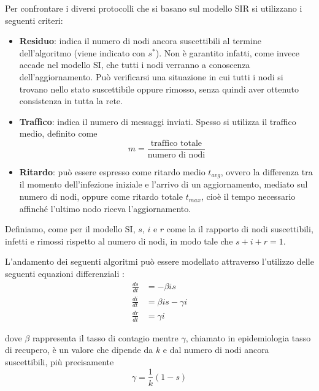 Per confrontare i diversi protocolli che si basano sul modello SIR si utilizzano i seguenti criteri:
\begin{itemize}
    \item \textbf{Residuo}: indica il numero di nodi ancora suscettibili al termine dell’algoritmo (viene indicato con $s^*$). Non è garantito infatti, come invece accade nel modello SI, che tutti i nodi verranno a conoscenza dell’aggiornamento. Può verificarsi una situazione in cui tutti i nodi si trovano nello stato suscettibile oppure rimosso, senza quindi aver ottenuto consistenza in tutta la rete.
    \item \textbf{Traffico}: indica il numero di messaggi inviati. Spesso si utilizza il traffico medio, definito come
    \begin{equation}
        m = \frac{\textrm{traffico totale}}{\textrm{numero di nodi}}        
    \end{equation}
    \item \textbf{Ritardo}: può essere espresso come ritardo medio $t_{avg}$, ovvero la differenza tra il momento dell'infezione iniziale e l'arrivo di un aggiornamento, mediato sul numero di nodi, oppure come ritardo totale $t_{max}$, cioè il tempo necessario affinché l'ultimo nodo riceva l'aggiornamento.
\end{itemize}  
Definiamo, come per il modello SI, $s$, $i$ e $r$ come la il rapporto di nodi suscettibili, infetti e rimossi rispetto al numero di nodi, in modo tale che $s + i + r = 1$.

L’andamento dei seguenti algoritmi può essere modellato attraverso l’utilizzo delle seguenti equazioni differenziali \cite{hethcote}:
\begin{equation}
    \begin{split}
        \frac{ds}{dt} & = - \beta is \\
    \frac{di}{dt} & = \beta is - \gamma i \\
    \frac{dr}{dt} & = \gamma i
    \end{split}
\end{equation}

dove $\beta$ rappresenta il tasso di contagio mentre $\gamma$, chiamato in epidemiologia tasso di recupero, è un valore che dipende da $k$ e dal numero di nodi ancora suscettibili, più precisamente
\begin{equation}
    \gamma = \frac{1}{k}(1-s)
\end{equation}

